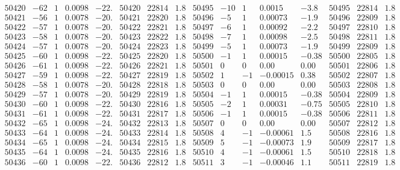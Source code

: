\documentclass[11pt,reqno,a4letter]{article}
\numberwithin{figure}{section}
\numberwithin{table}{section}
\theoremstyle{plain}
\numberwithin{theorem}{section}
\theoremstyle{definition}
\begin{document}
\begin{table}[ht]
\begin{equation*}
{\begin{array}{ccccc|ccc||ccccc|ccc}
50420 & -62 & 1 & 0.0098 & -22. & 50420 & 22814 & 1.8 & 50495 & -10 & 1 & 0.0015 & -3.8 & 50495 & 22814 & 1.8  \\
50421 & -56 & 1 & 0.0078 & -20. & 50421 & 22820 & 1.8 & 50496 & -5 & 1 & 0.00073 & -1.9 & 50496 & 22809 & 1.8  \\
50422 & -57 & 1 & 0.0078 & -20. & 50422 & 22821 & 1.8 & 50497 & -6 & 1 & 0.00092 & -2.2 & 50497 & 22810 & 1.8  \\
50423 & -58 & 1 & 0.0078 & -20. & 50423 & 22822 & 1.8 & 50498 & -7 & 1 & 0.00098 & -2.5 & 50498 & 22811 & 1.8  \\
50424 & -57 & 1 & 0.0078 & -20. & 50424 & 22823 & 1.8 & 50499 & -5 & 1 & 0.00073 & -1.9 & 50499 & 22809 & 1.8  \\
50425 & -60 & 1 & 0.0098 & -22. & 50425 & 22820 & 1.8 & 50500 & -1 & 1 & 0.00015 & -0.38 & 50500 & 22805 & 1.8  \\
50426 & -61 & 1 & 0.0098 & -22. & 50426 & 22821 & 1.8 & 50501 & 0 & 0 & 0.00 & 0.00 & 50501 & 22806 & 1.8  \\
50427 & -59 & 1 & 0.0098 & -22. & 50427 & 22819 & 1.8 & 50502 & 1 & -1 & -0.00015 & 0.38 & 50502 & 22807 & 1.8  \\
50428 & -58 & 1 & 0.0078 & -20. & 50428 & 22818 & 1.8 & 50503 & 0 & 0 & 0.00 & 0.00 & 50503 & 22808 & 1.8  \\
50429 & -57 & 1 & 0.0078 & -20. & 50429 & 22819 & 1.8 & 50504 & -1 & 1 & 0.00015 & -0.38 & 50504 & 22809 & 1.8  \\
50430 & -60 & 1 & 0.0098 & -22. & 50430 & 22816 & 1.8 & 50505 & -2 & 1 & 0.00031 & -0.75 & 50505 & 22810 & 1.8  \\
50431 & -61 & 1 & 0.0098 & -22. & 50431 & 22817 & 1.8 & 50506 & -1 & 1 & 0.00015 & -0.38 & 50506 & 22811 & 1.8  \\
50432 & -65 & 1 & 0.0098 & -24. & 50432 & 22813 & 1.8 & 50507 & 0 & 0 & 0.00 & 0.00 & 50507 & 22812 & 1.8  \\
50433 & -64 & 1 & 0.0098 & -24. & 50433 & 22814 & 1.8 & 50508 & 4 & -1 & -0.00061 & 1.5 & 50508 & 22816 & 1.8  \\
50434 & -65 & 1 & 0.0098 & -24. & 50434 & 22815 & 1.8 & 50509 & 5 & -1 & -0.00073 & 1.9 & 50509 & 22817 & 1.8  \\
50435 & -64 & 1 & 0.0098 & -24. & 50435 & 22816 & 1.8 & 50510 & 4 & -1 & -0.00061 & 1.5 & 50510 & 22818 & 1.8  \\
50436 & -60 & 1 & 0.0098 & -22. & 50436 & 22812 & 1.8 & 50511 & 3 & -1 & -0.00046 & 1.1 & 50511 & 22819 & 1.8  \\

\end{array}}
\end{equation*}
\end{table}
\end{document}
